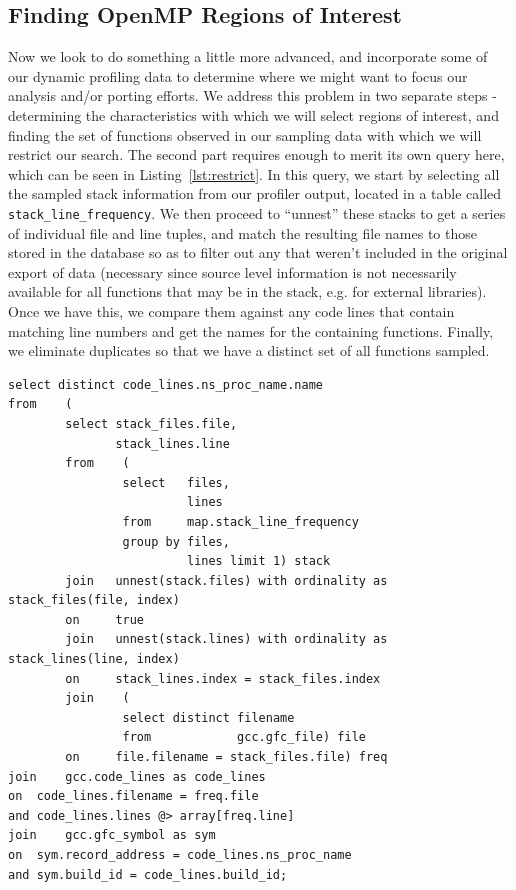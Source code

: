 \subsection{Finding OpenMP Regions of Interest}
Now we look to do something a little more advanced, and incorporate some of our dynamic profiling 
data to determine where we might want to focus our analysis and/or porting efforts.
We address this problem in two separate steps - determining the characteristics with which we will 
select regions of interest, and finding the set of functions observed in our sampling data with which 
we will restrict our search.
The second part requires enough to merit its own query here, which can be seen in 
Listing~\ref{lst:restrict}.
In this query, we start by selecting all the sampled stack information from our profiler output, located 
in a table called \texttt{stack\_line\_frequency}.
We then proceed to ``unnest'' these stacks to get a series of individual file and line tuples, and match 
the resulting file names to those stored in the database so as to filter out any that weren't included in 
the original export of data (necessary since source level information is not necessarily available for 
all functions that may be in the stack, e.g. for external libraries).
Once we have this, we compare them against any code lines that contain matching line numbers and 
get the names for the containing functions.
Finally, we eliminate duplicates so that we have a distinct set of all functions sampled.

\begin{lstlisting}[caption=Determing Functions Sampled, label=lst:restrict]
select distinct code_lines.ns_proc_name.name
from	(
		select stack_files.file,
		       stack_lines.line
		from	(
				select   files,
				         lines
				from     map.stack_line_frequency
				group by files,
				         lines limit 1) stack
		join   unnest(stack.files) with ordinality as stack_files(file, index)
		on     true
		join   unnest(stack.lines) with ordinality as stack_lines(line, index)
		on     stack_lines.index = stack_files.index
		join	(
				select distinct filename
				from            gcc.gfc_file) file
		on     file.filename = stack_files.file) freq
join	gcc.code_lines as code_lines
on	code_lines.filename = freq.file
and	code_lines.lines @> array[freq.line]
join	gcc.gfc_symbol as sym
on	sym.record_address = code_lines.ns_proc_name
and	sym.build_id = code_lines.build_id;
\end{lstlisting}

